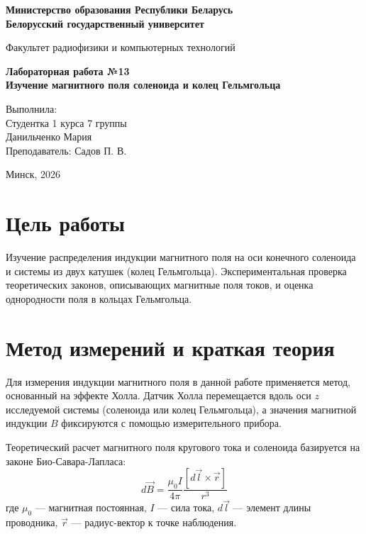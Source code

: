 \documentclass[a4paper,14pt]{extarticle}
\begin{document}
\begin{titlepage}
\begin{center}
\textbf{Министерство образования Республики Беларусь}\\
\textbf{Белорусский государственный университет}

Факультет радиофизики и компьютерных технологий
\vspace{6cm}

\textbf{Лабораторная работа №13}\\
\textbf{Изучение магнитного поля соленоида и колец Гельмгольца}
\end{center}

\vfill
\begin{flushright}
Выполнила:\\
Студентка 1 курса 7 группы\\
Данильченко Мария\\
Преподаватель: Садов П. В.\\
\end{flushright}

\vfill
\begin{center}
Минск, 2026
\end{center}
\end{titlepage}

\section*{Цель работы}
Изучение распределения индукции магнитного поля на оси конечного соленоида и системы из двух катушек (колец Гельмгольца). Экспериментальная проверка теоретических законов, описывающих магнитные поля токов, и оценка однородности поля в кольцах Гельмгольца.

\section*{Метод измерений и краткая теория}
Для измерения индукции магнитного поля в данной работе применяется метод, основанный на эффекте Холла. Датчик Холла перемещается вдоль оси $z$ исследуемой системы (соленоида или колец Гельмгольца), а значения магнитной индукции $B$ фиксируются с помощью измерительного прибора.

Теоретический расчет магнитного поля кругового тока и соленоида базируется на законе Био-Савара-Лапласа:
$$d\vec{B} = \frac{\mu_0 I}{4\pi} \frac{[d\vec{l} \times \vec{r}]}{r^3}$$
где $\mu_0$ — магнитная постоянная, $I$ — сила тока, $d\vec{l}$ — элемент длины проводника, $\vec{r}$ — радиус-вектор к точке наблюдения.
\end{document}
